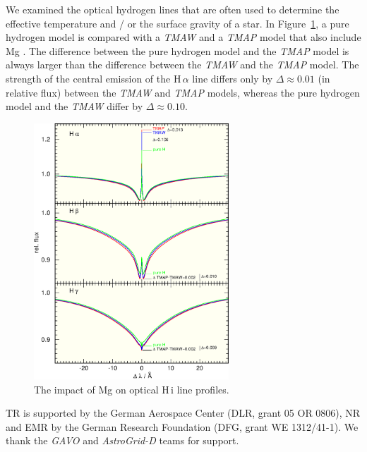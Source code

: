 We examined the optical hydrogen lines that are often used to determine the effective temperature and / or the surface gravity of a star. In Figure~\ref{fig:HMg}, a pure hydrogen model is compared with a \emph{TMAW} and a \emph{TMAP} model that also include Mg \citep[$T_\mathrm{eff}=60\,\mathrm{kK}$, $\log g = 7$, solar abundances,][]{asplundetal2009}. The difference between the pure hydrogen model and the  \emph{TMAP} model is always larger than the difference between the \emph{TMAW} and the \emph{TMAP} model. The strength of the central emission of the H\,$\alpha$ line differs only by $\Delta \approx 0.01$ (in relative flux) between the \emph{TMAW} and \emph{TMAP} models, whereas the pure hydrogen model and the \emph{TMAW} differ by $\Delta \approx 0.10$.


\begin{figure}[ht!]\centering
\includegraphics[width=0.65\textwidth]{part9/Rauch_P24/p24_f3.eps}
\caption{The impact of Mg on optical H\,{\sc i} line profiles.}
\label{fig:HMg}
\end{figure}


\acknowledgements 
TR is supported by the German Aerospace Center (DLR, grant 05 OR 0806), NR and EMR by the German Research Foundation (DFG, grant WE 1312/41-1). We thank the \emph{GAVO} and \emph{AstroGrid-D} teams for support.



